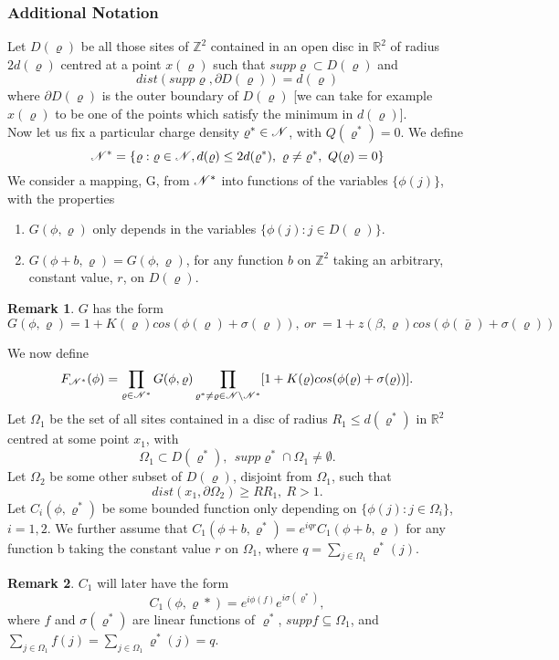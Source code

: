 \documentclass[11pt,reqno]{article}
\theoremstyle{definition}
\newtheorem*{remark}{Remark}
\begin{document}
\subsubsection{Additional Notation}
Let $D(\varrho)$ be all those sites of $\mathbb{Z}^2$ contained in an open disc in $\mathbb{R}^2$ of radius $2d(\varrho)$ centred at a point $x(\varrho)$ such that $supp\varrho \subset D(\varrho)$ and
$$
dist(supp\varrho, \partial D(\varrho)) = d(\varrho)
$$
where $\partial D(\varrho)$ is the outer boundary of $D(\varrho)$ [we can take for example $x(\varrho)$ to be one of the points which satisfy the minimum in $d(\varrho)$].\\
Now let us fix a particular charge density $\varrho^* \in \mathscr{N}$, with $Q(\varrho^*)=0$.
We define 
$$
\mathscr{N}^* = \{\varrho: \varrho \in \mathscr{N}, d(\varrho)\leq 2d(\varrho^*),\ \varrho \neq \varrho^*,\  Q(\varrho)=0\}
$$
We consider a mapping, G, from $\mathscr{N}^*$ into functions of the variables $\{ \phi(j) \}$, with the properties
\begin{enumerate}
\item $G(\phi, \varrho)$ only depends in the variables $\{ \phi(j): j \in D(\varrho) \}$.
\item $G(\phi + b, \varrho) = G(\phi, \varrho)$, for any function $b$ on $\mathbb{Z}^2$ taking an arbitrary, constant value, $r$, on $D(\varrho)$.
\end{enumerate}

\begin{remark}
$G$ has the form 
$$G(\phi, \varrho) = 1+K(\varrho)cos(\phi(\varrho) + \sigma(\varrho)),\ or\ =1+z(\beta, \varrho)cos(\phi(\bar{\varrho}) + \sigma(\varrho))
$$
\end{remark}
We now define
$$
F_{\mathscr{N}^*}(\phi) = \prod_{\varrho \in \mathscr{N}^*} G(\phi, \varrho)
\prod_{\varrho^* \neq \varrho \in \mathscr{N} \setminus \mathscr{N}^*}[1+K(\varrho)cos(\phi(\varrho) + \sigma(\varrho))].
$$
Let $\Omega_1$ be the set of all sites contained in a disc of radius $R_1 \leq d(\varrho^*)$ in $\mathbb{R}^2$ centred at some point $x_1$, with
$$
\Omega_1 \subset D(\varrho^*), \ \ supp\varrho^* \cap \Omega_1 \neq \emptyset.
$$
Let $\Omega_2$ be some other subset of $D(\varrho)$, disjoint from $\Omega_1$, such that
$$
dist(x_1, \partial\Omega_2) \geq RR_1, \ R > 1.
$$ 
Let $C_i(\phi, \varrho^*)$ be some bounded function only depending on $\{ \phi(j): j \in \Omega_i \}$, $i=1,2$. We further assume that $C_1(\phi+b, \varrho^*) = e^{iqr}C_1(\phi+b, \varrho)$ for any function b taking the constant value $r$ on $\Omega_1$, where $q=\sum_{j \in \Omega_1}\varrho^*(j)$.
\begin{remark}
$C_1$ will later have the form 
$$
C_1(\phi, \varrho*) = e^{i\phi(f)}e^{i\sigma(\varrho^*)},
$$
where $f$ and $\sigma(\varrho^*)$ are linear functions of $\varrho^*$, $suppf\subseteq\Omega_1$, and $\sum_{j \in \Omega_1}f(j) = \sum_{j \in \Omega_1}\varrho^*(j) = q$.
\end{remark}
\end{document}
